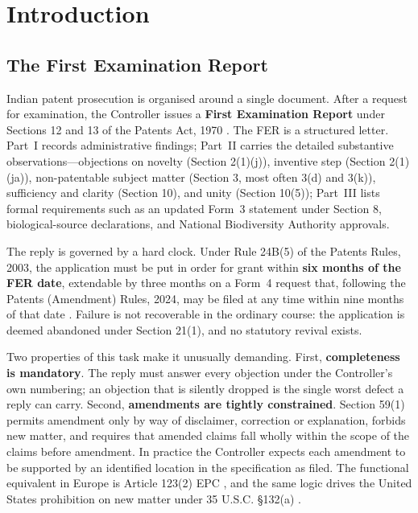 \documentclass[conference]{IEEEtran}
\begin{document}
\section{Introduction}

\subsection{The First Examination Report}

Indian patent prosecution is organised around a single document. After a request for examination, the Controller issues a \textbf{First Examination Report} under Sections 12 and 13 of the Patents Act, 1970 \cite{act1970}. The FER is a structured letter. Part~I records administrative findings; Part~II carries the detailed substantive observations---objections on novelty (Section 2(1)(j)), inventive step (Section 2(1)(ja)), non-patentable subject matter (Section 3, most often 3(d) and 3(k)), sufficiency and clarity (Section 10), and unity (Section 10(5)); Part~III lists formal requirements such as an updated Form~3 statement under Section 8, biological-source declarations, and National Biodiversity Authority approvals.

The reply is governed by a hard clock. Under Rule 24B(5) of the Patents Rules, 2003, the application must be put in order for grant within \textbf{six months of the FER date}, extendable by three months on a Form~4 request that, following the Patents (Amendment) Rules, 2024, may be filed at any time within nine months of that date \cite{rules2003}. Failure is not recoverable in the ordinary course: the application is deemed abandoned under Section 21(1), and no statutory revival exists.

Two properties of this task make it unusually demanding. First, \textbf{completeness is mandatory}. The reply must answer every objection under the Controller's own numbering; an objection that is silently dropped is the single worst defect a reply can carry. Second, \textbf{amendments are tightly constrained}. Section 59(1) permits amendment only by way of disclaimer, correction or explanation, forbids new matter, and requires that amended claims fall wholly within the scope of the claims before amendment. In practice the Controller expects each amendment to be supported by an identified location in the specification as filed. The functional equivalent in Europe is Article 123(2) EPC \cite{epc}, and the same logic drives the United States prohibition on new matter under 35 U.S.C. \S132(a) \cite{usc132}.
\end{document}
